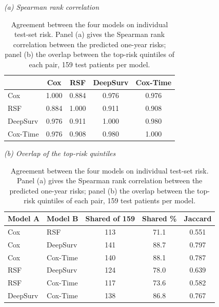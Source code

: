 \documentclass[11pt,a4paper]{article}
\begin{document}
\setcounter{table}{10}  %
\begin{table}[H]
\centering
\caption{Agreement between the four models on individual test-set risk. Panel (a) gives the
Spearman rank correlation between the predicted one-year risks; panel (b) the overlap between
the top-risk quintiles of each pair, 159 test patients per model.}
\label{tab:risk}
\vspace{0.3em}
\small
{\itshape (a) Spearman rank correlation}\\[0.3em]
\begin{tabular}{lcccc}
\toprule
 & Cox & RSF & DeepSurv & Cox-Time \\
\midrule
Cox      & 1.000 & 0.884 & 0.976 & 0.976 \\
RSF      & 0.884 & 1.000 & 0.911 & 0.908 \\
DeepSurv & 0.976 & 0.911 & 1.000 & 0.980 \\
Cox-Time & 0.976 & 0.908 & 0.980 & 1.000 \\
\bottomrule
\end{tabular}

\vspace{1em}
{\itshape (b) Overlap of the top-risk quintiles}\\[0.3em]
\begin{tabular}{llccc}
\toprule
Model A & Model B & Shared of 159 & Shared \% & Jaccard \\
\midrule
Cox      & RSF      & 113 & 71.1 & 0.551 \\
Cox      & DeepSurv & 141 & 88.7 & 0.797 \\
Cox      & Cox-Time & 140 & 88.1 & 0.787 \\
RSF      & DeepSurv & 124 & 78.0 & 0.639 \\
RSF      & Cox-Time & 117 & 73.6 & 0.582 \\
DeepSurv & Cox-Time & 138 & 86.8 & 0.767 \\
\bottomrule
\end{tabular}
\end{table}
\end{document}
